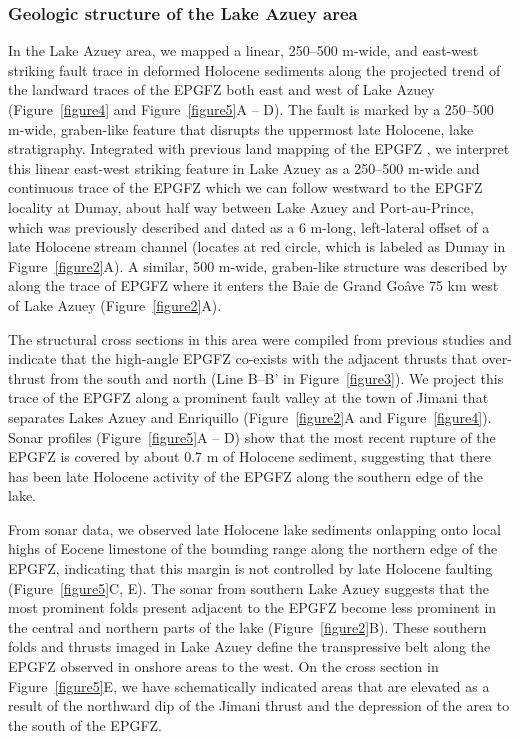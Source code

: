 \documentclass[linenumbers,draft]{agujournal}
\begin{document}
\subsubsection{Geologic structure of the Lake Azuey area} 
In the Lake Azuey area, we mapped a linear, 250--500 m-wide, and east-west striking fault trace in deformed Holocene sediments along the projected trend of the landward traces of the EPGFZ both east and west of Lake Azuey (Figure~\ref{figure4} and Figure~\ref{figure5}A -- D). The fault is marked by a 250--500 m-wide, graben-like feature that disrupts the uppermost late Holocene, lake stratigraphy. Integrated with previous land mapping of the EPGFZ \citep{bourgueil1988synthese,mann1995actively,prentice2010seismic,cowgill2012interactive}, we interpret this linear east-west striking feature in Lake Azuey as a 250--500 m-wide and continuous trace of the EPGFZ which we can follow westward to the EPGFZ locality at Dumay, about half way between Lake Azuey and Port-au-Prince, which was previously described and dated as a 6 m-long, left-lateral offset of a late Holocene stream channel \citep{cowgill2012interactive} (locates at red circle, which is labeled as Dumay in Figure~\ref{figure2}A). A similar, 500 m-wide, graben-like structure was described by \citet{hornbach2010high} along the trace of EPGFZ where it enters the Baie de Grand Go\^ave 75 km west of Lake Azuey (Figure~\ref{figure2}A). 

The structural cross sections in this area were compiled from previous studies \citep{massoni1955haiti,mann1995actively,douilly2015three} and indicate that the high-angle EPGFZ co-exists with the adjacent thrusts that over-thrust from the south and north (Line B--B' in Figure~\ref{figure3}). We project this trace of the EPGFZ along a prominent fault valley at the town of Jimani that separates Lakes Azuey and Enriquillo (Figure~\ref{figure2}A and Figure~\ref{figure4}). Sonar profiles (Figure~\ref{figure5}A -- D) show that the most recent rupture of the EPGFZ is covered by about 0.7 m of Holocene sediment, suggesting that there has been late Holocene activity of the EPGFZ along the southern edge of the lake.

From sonar data, we observed late Holocene lake sediments onlapping onto local highs of Eocene limestone of the bounding range along the northern edge of the EPGFZ, indicating that this margin is not controlled by late Holocene faulting (Figure~\ref{figure5}C, E). The sonar from southern Lake Azuey suggests that the most prominent folds present adjacent to the EPGFZ become less prominent in the central and northern parts of the lake (Figure~\ref{figure2}B). These southern folds and thrusts imaged in Lake Azuey define the transpressive belt along the EPGFZ observed in onshore areas to the west. On the cross section in Figure~\ref{figure5}E, we have schematically indicated areas that are elevated as a result of the northward dip of the Jimani thrust and the depression of the area to the south of the EPGFZ.
\end{document}

